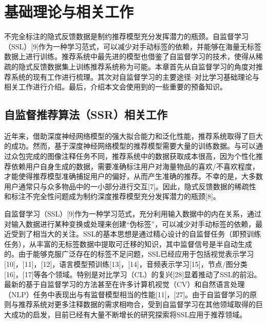 
\chapter{基础理论与相关工作}
\label{cha:intro1}

不完全标注的隐式反馈数据是制约推荐模型充分发挥潜力的瓶颈。自监督学习（SSL）[9]作为一种学习范式，可以减少对手动标签的依赖，并能够在海量无标签数据上进行训练。推荐系统中最先进的模型也借鉴了自监督学习的技术，使得从稀疏的隐式反馈数据集上训练推荐系统称为可能。本章首先从自监督学习的角度对推荐系统的现有工作进行梳理。其次对自监督学习的主要途径--对比学习基础理论与相关工作进行介绍。最后，介绍本文会使用到的一些重要的预备知识。

\section{自监督推荐算法（SSR）相关工作}
近年来，借助深度神经网络模型的强大拟合能力和泛化性能，推荐系统取得了巨大的成功。然而，基于深度神经网络模型的推荐模型需要大量的训练数据。与可以通过众包完成的图像注释任务不同，推荐系统中的数据获取成本很高，因为个性化推荐依赖用户自身生成的数据，需要准确标注用户对海量物品的喜欢/不喜欢程度，才能使得推荐模型准确捕捉用户的偏好，从而产生准确的推荐。不幸的是，大多数用户通常只与众多物品中的一小部分进行交互[7]。因此，隐式反馈数据的稀疏性和标注不完全性问题成为制约深度推荐模型充分发挥潜力的瓶颈[8]。

自监督学习（SSL）[9]作为一种学习范式，充分利用输入数据中的内在关系，通过对输入数据进行某种变换或处理来创建“伪标签”，可以减少对手动标签的依赖，最近受到了相当大的关注。SSL的基本思想是通过精心设计的自监督任务（即预训练任务），从丰富的无标签数据中提取可迁移的知识，其中监督信号是半自动生成的。由于能够克服广泛存在的标签不足问题，SSL已经应用于包括视觉表示学习[10]，[11]，[12]，语言模型预训练[13]，[14]，音频表示学习[15]，节点/图分类[16]，[17]等各个领域。特别是对比学习（CL）的复兴[28]显着推动了SSL的前沿。最新的基于自监督学习的方法甚至在许多计算机视觉（CV）和自然语言处理（NLP）任务中表现出与有监督模型相当的性能[11]，[27]。由于自监督学习的原则与推荐系统对更多注释数据的需求相吻合，受到自监督学习在其他领域取得的巨大成功的启发，目前已经有大量不断增长的研究探索将SSL应用于推荐领域。

